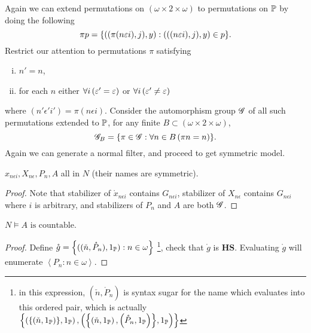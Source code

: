 Again we can extend permutations on \((\omega\times2\times\omega)\) to permutations on \(\P\) by doing the following
\[\pi p = \set{ ((\pi(n\epsilon i), j), y): (((n\epsilon i),j), y) \in p }.\]
Restrict our attention to permutations \(\pi\) satisfying
\begin{enumerate}[i.]
    \item \(n' = n\),
    \item for each \(n\) either \(\forall i\paren{\epsilon' = \epsilon}\) or \(\forall i\paren{\epsilon' \ne \epsilon}\)
\end{enumerate}
where \((n'\epsilon' i') = \pi(n\epsilon i)\).
Consider the automorphism group \(\G\) of all such permutations extended to \(\P\),
for any finite \(B\subset (\omega\times2\times\omega)\),
\[ \G_B = \set{ \pi\in \G: \forall n\in B\left( \pi n = n \right) }. \]
Again we can generate a normal filter, and proceed to get symmetric model.


\begin{proposition}
    \(x_{n\epsilon i}, X_{n\epsilon}, P_n, A\) all in \(N\) (their names are symmetric).
\end{proposition}
\begin{proof}
    Note that stabilizer of \(\mathring{x}_{n\epsilon i}\) contains \(G_{n\epsilon i}\),
    stabilizer of \(X_{n\epsilon}\) contains \(G_{n\epsilon i}\) where \(i\) is arbitrary,
    and stabilizers of \(P_n\) and \(A\) are both \(\G\).
\end{proof}

\begin{lemma}
    \(N\models A\text{ is countable}\).
\end{lemma}
\begin{proof}
  Define \(\mathring{g} = \set{((\check{n}, \mathring{P}_n), 1_\P): n\in\omega}\)
  \footnote{in this expression, \((\check{n}, \mathring{P}_n)\) is syntax sugar for the name which evaluates into this ordered pair,
  which is actually \(\set{\paren{\set{\paren{\check{n},1_\P}},1_\P},\paren{\set{\paren{\check{n},1_\P},\paren{\mathring{P}_n,1_\P}},1_\P}}\)},
  check that \(\mathring{g}\) is \(\mathbf{HS}\).
  Evaluating \(\mathring{g}\) will enumerate \(\left\langle P_n: n\in\omega\right\rangle\).
\end{proof}

